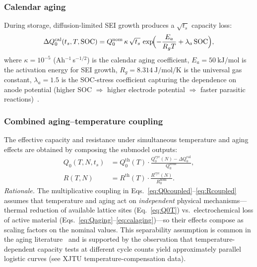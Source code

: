 \documentclass[5p,times,number]{elsarticle}
\newcommand{\eqnrefp}[1]{\textcolor{supercolor}{Eq.~\ref{#1}}}
\newcommand{\eqnsref}[2]{\textcolor{supercolor}{Eqs.~\eqref{#1}--\eqref{#2}}}
\newcommand{\refsref}[2]{\textcolor{supercolor}{Eqs.~\ref{#1}--\ref{#2}}}
\begin{document}
\subsubsection{Calendar aging}
During storage, diffusion-limited SEI growth produces a $\sqrt{t_s}$ capacity loss:
\begin{equation}\label{eq:calaging}
\Delta Q_0^{\mathrm{cal}}(t_s, T, \mathrm{SOC}) = Q_0^{\mathrm{nom}}\,\kappa\,\sqrt{t_s}\,\exp\!\Bigl(-\frac{E_a}{R_g T} + \lambda_a\,\mathrm{SOC}\Bigr),
\end{equation}
where $\kappa = 10^{-5}$ (Ah$^{-1}$\,s$^{-1/2}$) is the calendar aging coefficient, $E_a = \SI{50}{\kilo\joule\per\mole}$ is the activation energy for SEI growth, $R_g = \SI{8.314}{\joule\per\mole\per\kelvin}$ is the universal gas constant, $\lambda_a = 1.5$ is the SOC-stress coefficient capturing the dependence on anode potential (higher SOC $\Rightarrow$ higher electrode potential $\Rightarrow$ faster parasitic reactions)~\cite{Vetter2005}.

\subsubsection{Combined aging--temperature coupling}\label{sec:coupling}
The effective capacity and resistance under simultaneous temperature and aging effects are obtained by composing the submodel outputs:
\begin{align}
Q_0(T, N, t_s) &= Q_0^{\mathrm{th}}(T) \cdot \frac{Q_0^{\mathrm{cyc}}(N) - \Delta Q_0^{\mathrm{cal}}}{Q_0^{\mathrm{nom}}}, \label{eq:Q0coupled}\\[4pt]
R(T, N) &= R^{\mathrm{th}}(T) \cdot \frac{R^{\mathrm{cyc}}(N)}{R_0^{\mathrm{nom}}}. \label{eq:Rcoupled}
\end{align}
\emph{Rationale.}
The multiplicative coupling in \eqnsref{eq:Q0coupled}{eq:Rcoupled} assumes that temperature and aging act on \emph{independent} physical mechanisms---thermal reduction of available lattice sites (\eqnrefp{eq:Q0T}) vs.\ electrochemical loss of active material (\refsref{eq:Qaging}{eq:calaging})---so their effects compose as scaling factors on the nominal values.
This separability assumption is common in the aging literature~\cite{Vetter2005,Li2019,Tang2019ECM} and is supported by the observation that temperature-dependent capacity tests at different cycle counts yield approximately parallel logistic curves (see XJTU temperature-compensation data).
\end{document}
